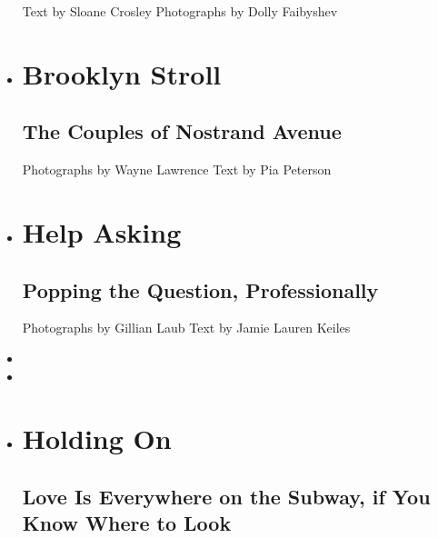 \begin{itemize}
   Text by Sloane Crosley Photographs by Dolly Faibyshev 
\item
  \href{https://www.nytimes3xbfgragh.onion/interactive/2018/06/07/magazine/new-york-love-nostrand-avenue-couples.html}{}

  \hypertarget{brooklyn-stroll}{%
  \section{Brooklyn Stroll}\label{brooklyn-stroll}}

  \hypertarget{the-couples-of-nostrand-avenue}{%
  \subsection{The Couples of Nostrand
  Avenue}\label{the-couples-of-nostrand-avenue}}

   Photographs by Wayne Lawrence Text by Pia Peterson 
\item
  \href{https://www.nytimes3xbfgragh.onion/interactive/2018/06/07/magazine/new-york-love-wedding-proposal-planners.html}{}

  \hypertarget{help-asking}{%
  \section{Help Asking}\label{help-asking}}

  \hypertarget{popping-the-question-professionally}{%
  \subsection{Popping the Question,
  Professionally}\label{popping-the-question-professionally}}

   Photographs by Gillian Laub Text by Jamie Lauren Keiles 
\item
\item
\item
  \href{https://www.nytimes3xbfgragh.onion/interactive/2018/06/07/magazine/new-york-love-holding-hands-subway.html}{}

  \hypertarget{holding-on}{%
  \section{Holding On}\label{holding-on}}

  \hypertarget{love-is-everywhere-on-the-subway-if-you-know-where-to-look}{%
  \subsection{Love Is Everywhere on the Subway, if You Know Where to
  Look}\label{love-is-everywhere-on-the-subway-if-you-know-where-to-look}}


\end{itemize}
